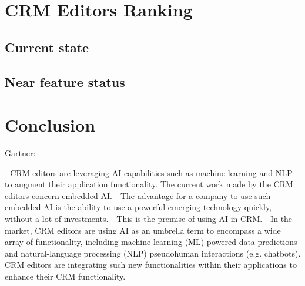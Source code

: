 \section{CRM Editors Ranking}


\subsection{Current state}


\subsection{Near feature status}


\section{Conclusion}

Gartner:

    - CRM editors are leveraging AI capabilities such as machine learning and NLP to augment their application functionality. The current work made by the CRM editors concern embedded AI.
    - The advantage for a company to use such embedded AI is the ability to use a powerful emerging technology quickly, without a lot of investments. 
    - This is the premise of using AI in CRM.
    - In the market, CRM editors are using AI as an umbrella term to encompass a wide array of functionality, including machine learning (ML) powered data predictions and natural-language processing (NLP) pseudohuman interactions (e.g. chatbots).  CRM editors are integrating such new functionalities within their applications to enhance their CRM functionality.


